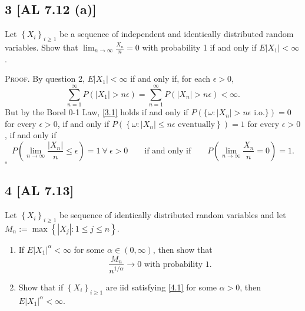\documentclass[12pt]{article}
\newcounter{ProofCounter}
\newenvironment{Proof}{\stepcounter{ProofCounter}\textsc{Proof.}}{\hfill$\square$}
\begin{document}
\subsection*{3 [AL 7.12 (a)]}
\begin{tcolorbox}
Let $\left\{ X_{i} \right\}_{i\geq 1}$ be a sequence of independent and identically distributed random variables. Show that
$\lim_{n\rightarrow\infty}\frac{X_{n}}{n} = 0$ with probability 1 if and only if $E|X_{1}| < \infty$.
\end{tcolorbox}
\begin{Proof}
By question 2, $E|X_{1}| < \infty$ if and only if, for each $\epsilon > 0$,
\begin{equation}
\sum_{n=1}^{\infty}P(|X_{1}| > n\epsilon) = \sum_{n=1}^{\infty}P(|X_{n}| > n\epsilon) < \infty. 
\label{3.1}
\end{equation}
But by the Borel 0-1 Law, \eqref{3.1} holds if and only if $P(\{\omega : |X_{n}| > n\epsilon \text{ i.o.}\}) = 0$ for every $\epsilon > 0$, 
if and only if $P(\left\{ \omega : |X_{n}| \leq n\epsilon \text{ eventually} \right\}) = 1$ for every $\epsilon > 0$,
if and only if 
\[ P\left(\lim_{n\rightarrow\infty}\frac{|X_{n}|}{n} \leq \epsilon\right) = 1 \ \forall \ \epsilon > 0
\qquad \text{if and only if} \qquad P\left(\lim_{n\rightarrow\infty}\frac{X_{n}}{n} = 0\right) = 1. \]
\end{Proof}


\subsection*{4 [AL 7.13]}
\begin{tcolorbox}
Let $\left\{ X_{i} \right\}_{i\geq 1}$ be sequence of identically distributed random variables and let $M_{n} := \max\left\{ |X_{j}| : 1 \leq j \leq n
\right\}$.
\begin{enumerate}[label=(\alph*)]
\item If $E|X_{1}|^{\alpha} < \infty$ for some $\alpha \in (0,\infty)$, then show that 
\begin{equation}
\frac{M_{n}}{n^{1/\alpha}} \rightarrow 0 \text{ with probability 1}. 
\label{4.1}
\end{equation}
\item Show that if $\left\{ X_{i} \right\}_{i\geq 1}$ are iid satisfying \eqref{4.1} for some $\alpha > 0$, then $E|X_{1}|^{\alpha} < \infty$.
\end{enumerate}
\end{tcolorbox}
\end{document}
